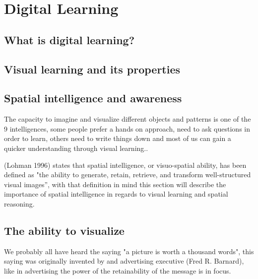 \section{Digital Learning}\label{ch:digital_learning_ch}
\subsection{What is digital learning?}\label{ch:what_is_digital_learning}
\subsection{Visual learning and its properties}\label{ch:visual_learning_and_its_properties}
\subsection{Spatial intelligence and awareness}\label{ch:spatial_intelligence_and_awareness}
The capacity to imagine and visualize different objects and patterns is one of the 9 intelligences, some people prefer a hands on approach, need to ask questions in order to learn, others need to write things down and most of us can gain a quicker understanding through visual learning.\cite*{pracpsych2022}.


(Lohman 1996) states that spatial intelligence, or visuo-spatial ability, has been defined as "the ability to generate, retain, retrieve, and transform well-structured visual images”\cite[p97]{tapsfield1996}, with that definition in mind this section will describe the importance of spatial intelligence in regards to visual learning and spatial reasoning.


\subsection{The ability to visualize}\label{ch:the_ability_to_visualize}
We probably all have heard the saying "a picture is worth a thousand words", this saying was originally invented by and advertising executive (Fred R. Barnard)\cite*{phrases2022}, like in advertising the power of the retainability of the message is in focus. 



